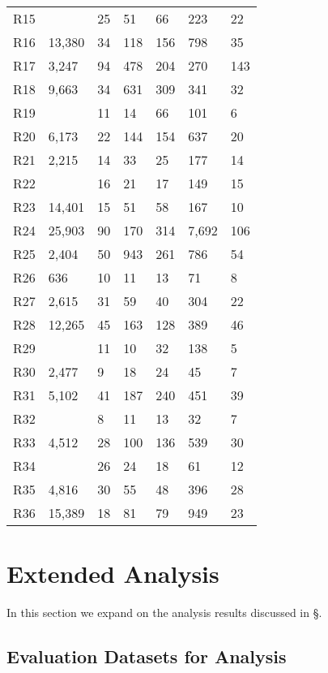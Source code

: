 \begin{table}
\begin{tabular}{lllllll}
R15 &  & 25 & 51 & 66 & 223 & 22 \\
R16 & 13,380 & 34 & 118 & 156 & 798 & 35 \\
R17 & 3,247 & 94 & 478 & 204 & 270 & 143 \\
R18 & 9,663 & 34 & 631 & 309 & 341 & 32 \\
R19 &  & 11 & 14 & 66 & 101 & 6 \\
R20 & 6,173 & 22 & 144 & 154 & 637 & 20 \\
R21 & 2,215 & 14 & 33 & 25 & 177 & 14 \\
R22 &  & 16 & 21 & 17 & 149 & 15 \\
R23 & 14,401 & 15 & 51 & 58 & 167 & 10 \\
R24 & 25,903 & 90 & 170 & 314 & 7,692 & 106 \\
R25 & 2,404 & 50 & 943 & 261 & 786 & 54 \\
R26 & 636 & 10 & 11 & 13 & 71 & 8 \\
R27 & 2,615 & 31 & 59 & 40 & 304 & 22 \\
R28 & 12,265 & 45 & 163 & 128 & 389 & 46 \\
R29 &  & 11 & 10 & 32 & 138 & 5 \\
R30 & 2,477 & 9 & 18 & 24 & 45 & 7 \\
R31 & 5,102 & 41 & 187 & 240 & 451 & 39 \\
R32 &  & 8 & 11 & 13 & 32 & 7 \\
R33 & 4,512 & 28 & 100 & 136 & 539 & 30 \\
R34 &  & 26 & 24 & 18 & 61 & 12 \\
R35 & 4,816 & 30 & 55 & 48 & 396 & 28 \\
R36 & 15,389 & 18 & 81 & 79 & 949 & 23 \\
\bottomrule
\end{tabular}
\end{table}



\section{Extended Analysis}
\label{app:analysis}

In this section we expand on the analysis results discussed in \S{}.

\subsection{Evaluation Datasets for Analysis}
\label{app:analysis_datasets}

